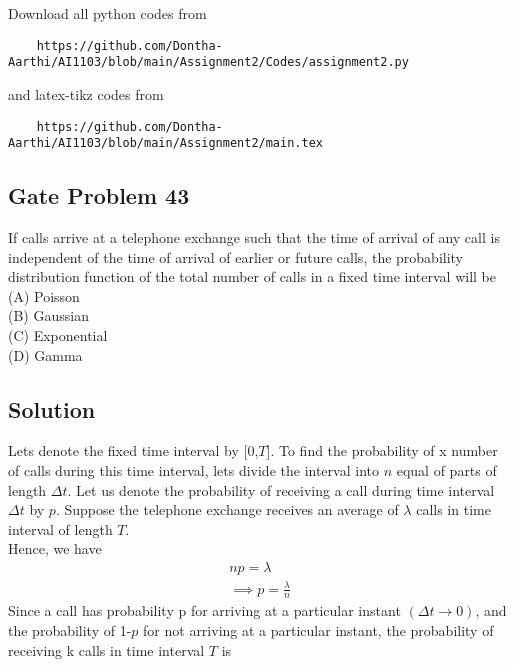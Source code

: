 \documentclass[journal,12pt,twocolumn]{IEEEtran}
\begin{document}
\maketitle
\newpage
\bigskip
\renewcommand{\thefigure}{\theenumi}
\renewcommand{\thetable}{\theenumi}
Download all python codes from 
\begin{lstlisting}
    https://github.com/Dontha-Aarthi/AI1103/blob/main/Assignment2/Codes/assignment2.py
\end{lstlisting}
%
and latex-tikz codes from 
%
\begin{lstlisting}
    https://github.com/Dontha-Aarthi/AI1103/blob/main/Assignment2/main.tex
\end{lstlisting}
\begin{center}
  \section{\textbf{Gate Problem 43}} 
\end{center}
    If calls arrive at a telephone exchange such that
the time of arrival of any call is independent
of the time of arrival of earlier or future calls,
the probability distribution function of the total
number of calls in a fixed time interval will be\\
(A) Poisson\\
(B) Gaussian\\
(C) Exponential\\
(D) Gamma\\
\begin{center}
   \section{\textbf{Solution}}
\end{center}
Lets denote the fixed time interval by [0,$T$].
To find the probability of x number of calls during this time interval, lets divide the interval into $n$ equal of parts of length $\Delta t$.
Let us denote the probability of receiving a call during time interval $\Delta t$ by $p$. Suppose the telephone exchange receives an average of $\lambda$ calls in time interval of length $T$.\\
Hence, we have
\begin{align}
    np=\lambda\\
    \implies p=\frac{\lambda}{n}
\end{align}
Since a call has probability p for arriving at a particular instant $(\Delta t\rightarrow 0)$, and the probability of 1-$p$ for not arriving at a particular instant, the probability of receiving k calls in time interval $T$ is
\end{document}
